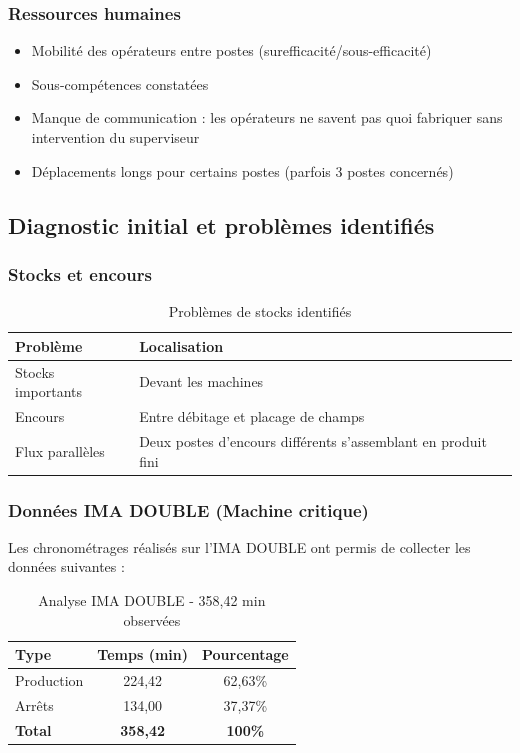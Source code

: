 \documentclass[12pt,a4paper]{article}
\begin{document}
\begin{center}
\subsubsection{Ressources humaines}
\begin{itemize}
    \item Mobilité des opérateurs entre postes (surefficacité/sous-efficacité)
    \item Sous-compétences constatées
    \item Manque de communication : les opérateurs ne savent pas quoi fabriquer sans intervention du superviseur
    \item Déplacements longs pour certains postes (parfois 3 postes concernés)
\end{itemize}

\subsection{Diagnostic initial et problèmes identifiés}

\subsubsection{Stocks et encours}

\begin{table}[H]
\centering
\caption{Problèmes de stocks identifiés}
\label{tab:ynion_stocks}
\begin{tabular}{|p{4cm}|p{8cm}|}
\hline
\textbf{Problème} & \textbf{Localisation} \\ \hline
Stocks importants & Devant les machines \\ \hline
Encours & Entre débitage et placage de champs \\ \hline
Flux parallèles & Deux postes d'encours différents s'assemblant en produit fini \\ \hline
\end{tabular}
\end{table}

\subsubsection{Données IMA DOUBLE (Machine critique)}

Les chronométrages réalisés sur l'IMA DOUBLE ont permis de collecter les données suivantes :

\begin{table}[H]
\centering
\caption{Analyse IMA DOUBLE - 358,42 min observées}
\label{tab:ynion_ima}
\begin{tabular}{|l|c|c|}
\hline
\textbf{Type} & \textbf{Temps (min)} & \textbf{Pourcentage} \\ \hline
Production & 224,42 & 62,63\% \\ \hline
Arrêts & 134,00 & 37,37\% \\ \hline
\textbf{Total} & \textbf{358,42} & \textbf{100\%} \\ \hline
\end{tabular}
\end{table}


\end{center}
\end{document}
